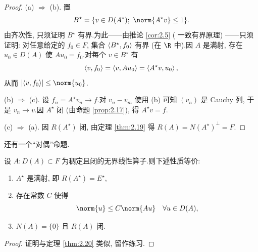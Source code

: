 \begin{proof}
(a) $\Rightarrow$ (b). 置
\begin{equation*}
B^\star=\{v\in D(A^\star);\ \norm{A^\star v}\le1\}.
\end{equation*}
由齐次性, 只须证明 $B^\star$ 有界.为此——由推论  \ref{cor:2.5} (
一致有界原理)
——只须证明: 对任意给定的 $f_0\in F$, 集合 $\left\langle B^\star,f_0\right\rangle$ 有界 (在 $\R$
中).因 $A$ 是满射, 存在 $u_0\in D(A)$ 使 $Au_0=f_0$.对每个 $v\in B^\star$ 有
\begin{equation*}
\left\langle v,f_0\right\rangle=\left\langle v,Au_0\right\rangle=\left\langle A^\star v,u_0\right\rangle,
\end{equation*}
从而 $\abs{\dual{v}{f_0}}\le\norm{u_0}$.

(b) $\Rightarrow$ (c). 设 $f_n=A^\star v_n\to f$.对 $v_n-v_m$ 使用 (b) 可知
$(v_n)$ 是 Cauchy 列, 于是 $v_n\to v$.因 $A^\star$ 闭 (由命题  \ref{prop:2.17}),
得 $A^\star v=f$.

(c) $\Rightarrow$ (a). 因 $R(A^\star)$ 闭, 由定理  \ref{thm:2.19} 得
$R(A)=N(A^\star)^\perp=F$.
\end{proof}

还有一个``对偶''命题.

\begin{startheorem}
\label{thm:2.21}
设 $A:D(A)\subset F$ 为稠定且闭的无界线性算子.则下述性质等价:
\begin{enumerate}[label=(\alph*), leftmargin=2.0em, itemsep=0.15em]
	\item $A^\star$ 是满射, 即 $R(A^\star)=E^\star$,
	\item 存在常数 $C$ 使得
	      \begin{equation*}
	      \norm{u}\le C\norm{Au}\quad \forall u\in D(A),
	      \end{equation*}
	\item $N(A)=\{0\}$ 且 $R(A)$ 闭.
\end{enumerate}
\end{startheorem}

\begin{proof}
证明与定理  \ref{thm:2.20} 类似, 留作练习.
\end{proof}

